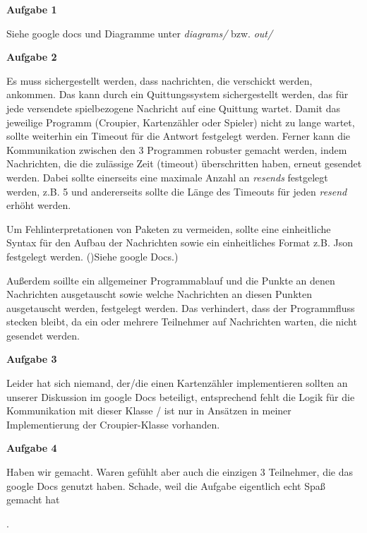 \documentclass[a4paper, 12pt]{article}
\begin{document}
	\pagestyle{fancy}
	\fancyhead{}
	
	
	\parindent=0cm
	
	\large
	\textbf{Aufgabe 1}\par
	\normalsize
	\vspace{12pt}
	Siehe google docs und Diagramme unter \textit{diagrams/} bzw. \textit{out/}
	\vspace{24pt}
	
	\large
	\textbf{Aufgabe 2}\par
	\normalsize
	\vspace{12pt}
	
	Es muss sichergestellt werden, dass nachrichten, die verschickt werden, ankommen. Das kann durch ein Quittungssystem sichergestellt werden, das für jede versendete spielbezogene Nachricht auf eine Quittung wartet. Damit das jeweilige Programm (Croupier, Kartenzähler oder Spieler) nicht zu lange wartet, sollte weiterhin ein Timeout für die Antwort festgelegt werden. Ferner kann die Kommunikation zwischen den 3 Programmen robuster gemacht werden, indem Nachrichten, die die zulässige Zeit (timeout) überschritten haben, erneut gesendet werden. Dabei sollte einerseits eine maximale Anzahl an \textit{resends} festgelegt werden, z.B. 5 und andererseits sollte die Länge des Timeouts für jeden \textit{resend} erhöht werden.\par
	Um Fehlinterpretationen von Paketen zu vermeiden, sollte eine einheitliche Syntax für den Aufbau der Nachrichten sowie ein einheitliches Format z.B. Json festgelegt werden. ()Siehe google Docs.)\par
	Außerdem soillte ein allgemeiner Programmablauf und die Punkte an denen Nachrichten ausgetauscht sowie welche Nachrichten an diesen Punkten ausgetauscht werden, festgelegt werden. Das verhindert, dass der Programmfluss stecken bleibt, da ein oder mehrere Teilnehmer auf Nachrichten warten, die nicht gesendet werden.\par
	
	\large
	\textbf{Aufgabe 3}\par
	\normalsize
	\vspace{12pt}
	Leider hat sich niemand, der/die einen Kartenzähler implementieren sollten an unserer Diskussion im google Docs beteiligt, entsprechend fehlt die Logik für die Kommunikation mit dieser Klasse / ist nur in Ansätzen in meiner Implementierung der Croupier-Klasse vorhanden.\par
	
	\large
	\textbf{Aufgabe 4}\par
	\normalsize
	\vspace{12pt}
	
	Haben wir gemacht. Waren gefühlt aber auch die einzigen 3 Teilnehmer, die das google Docs genutzt haben. Schade, weil die Aufgabe eigentlich echt Spaß gemacht hat\par. 
	
	
\end{document}
